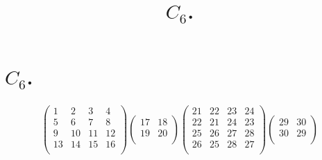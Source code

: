 \documentclass[11pt,a4paper]{amsart}
\title{$C_6$.}
\begin{document}
\section*{$C_6$.}

\begin{align*}
  \left(
  \begin{array}{c|c|c|c}
    1&2&3&4\\
\hline
    5&6&7&8\\
\hline
    9&10&11&12\\
\hline
    13&14&15&16\\
  \end{array}
\right)
  \left(
  \begin{array}{c|c}
    17&18\\
\hline
    19&20\\
  \end{array}
\right)
  \left(
  \begin{array}{cc|cc}
    21&22&23&24\\
    22&21&24&23\\
\hline
    25&26&27&28\\
    26&25&28&27\\
  \end{array}
\right)
  \left(
  \begin{array}{cc}
    29&30\\
    30&29\\
  \end{array}
\right)
\end{align*}
\end{document}
